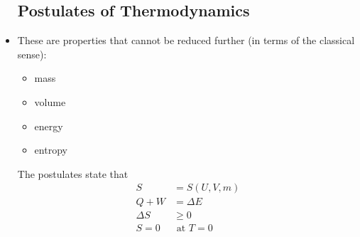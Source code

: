 \begin{itemize}
    \subsection{Postulates of Thermodynamics}
    \item These are properties that cannot be reduced further (in terms of the classical sense):
    \begin{itemize}
        \item mass
        \item volume 
        \item energy
        \item entropy
    \end{itemize}
    \begin{idea}
        The postulates state that
        \begin{align}
            S &= S(U,V,m) \\ 
            Q+W &= \Delta E \\ 
            \Delta S &\ge 0 \\ 
            S=0&\text{ at } T=0
        \end{align}
    \end{idea}
\end{itemize}